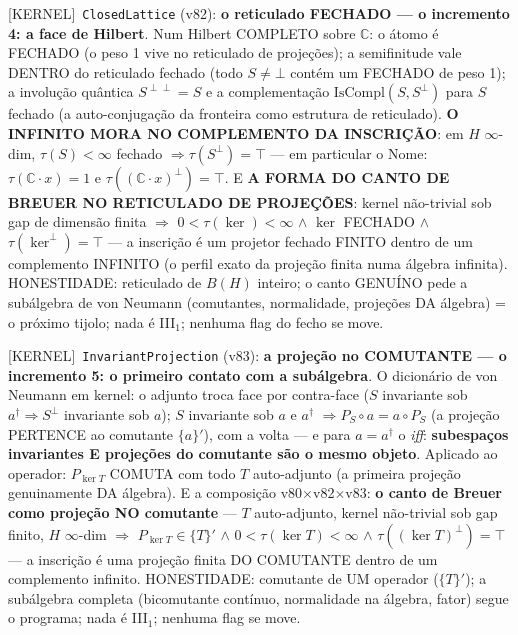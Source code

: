 \documentclass[11pt]{article}
\providecommand{\kernelmk}[1]{\textsf{[KERNEL]}~\texttt{#1}}\providecommand{\knownmk}[1]{\textsf{[KNOWN]}~{#1}}\providecommand{\statusmk}[1]{\textsf{[#1]}}
\theoremstyle{definition}\newtheorem{deriv}{Derivação}
\begin{document}
\kernelmk{ClosedLattice} (v82): \textbf{o reticulado FECHADO --- o incremento 4: a face de Hilbert}. Num Hilbert COMPLETO sobre $\mathbb C$: o átomo é FECHADO (o peso 1 vive no reticulado de projeções); a semifinitude vale DENTRO do reticulado fechado (todo $S\neq\bot$ contém um FECHADO de peso 1); a involução quântica $S^{\perp\perp}=S$ e a complementação $\mathrm{IsCompl}(S,S^\perp)$ para $S$ fechado (a auto-conjugação da fronteira como estrutura de reticulado). \textbf{O INFINITO MORA NO COMPLEMENTO DA INSCRIÇÃO}: em $H$ $\infty$-dim, $\tau(S)<\infty$ fechado $\Rightarrow\tau(S^\perp)=\top$ --- em particular o Nome: $\tau(\mathbb C\!\cdot\!x)=1$ e $\tau((\mathbb C\!\cdot\!x)^\perp)=\top$. E \textbf{A FORMA DO CANTO DE BREUER NO RETICULADO DE PROJEÇÕES}: kernel não-trivial sob gap de dimensão finita $\Rightarrow$ $0<\tau(\ker)<\infty$ $\wedge$ $\ker$ FECHADO $\wedge$ $\tau(\ker^\perp)=\top$ --- a inscrição é um projetor fechado FINITO dentro de um complemento INFINITO (o perfil exato da projeção finita numa álgebra infinita). HONESTIDADE: reticulado de $B(H)$ inteiro; o canto GENUÍNO pede a subálgebra de von Neumann (comutantes, normalidade, projeções DA álgebra) = o próximo tijolo; nada é III$_1$; nenhuma flag do fecho se move.

\kernelmk{InvariantProjection} (v83): \textbf{a projeção no COMUTANTE --- o incremento 5: o primeiro contato com a subálgebra}. O dicionário de von Neumann em kernel: o adjunto troca face por contra-face ($S$ invariante sob $a^\dagger\Rightarrow S^\perp$ invariante sob $a$); $S$ invariante sob $a$ e $a^\dagger$ $\Rightarrow P_S\circ a=a\circ P_S$ (a projeção PERTENCE ao comutante $\{a\}'$), com a volta --- e para $a=a^\dagger$ o \emph{iff}: \textbf{subespaços invariantes E projeções do comutante são o mesmo objeto}. Aplicado ao operador: $P_{\ker T}$ COMUTA com todo $T$ auto-adjunto (a primeira projeção genuinamente DA álgebra). E a composição v80$\times$v82$\times$v83: \textbf{o canto de Breuer como projeção NO comutante} --- $T$ auto-adjunto, kernel não-trivial sob gap finito, $H$ $\infty$-dim $\Rightarrow$ $P_{\ker T}\in\{T\}'$ $\wedge$ $0<\tau(\ker T)<\infty$ $\wedge$ $\tau((\ker T)^\perp)=\top$ --- a inscrição é uma projeção finita DO COMUTANTE dentro de um complemento infinito. HONESTIDADE: comutante de UM operador ($\{T\}'$); a subálgebra completa (bicomutante contínuo, normalidade na álgebra, fator) segue o programa; nada é III$_1$; nenhuma flag se move.
\end{document}
